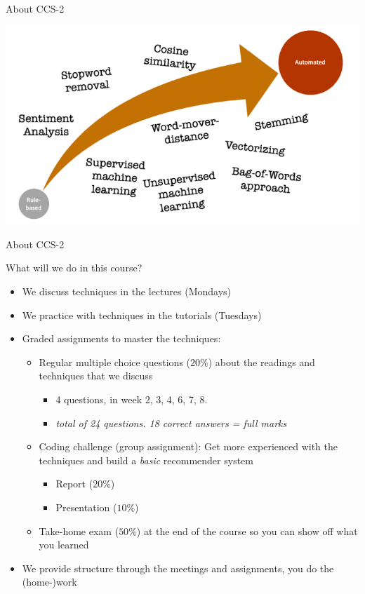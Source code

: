 \documentclass[handout]{beamer}
\begin{document}
\begin{frame}{About CCS-2}
	\begin{center}
		\includegraphics[width=\linewidth,height=\textheight,keepaspectratio]{../pictures/Roadmap_terms.png} 
	\end{center}
	
\end{frame}


\begin{frame}{About CCS-2} 

What will we do in this course?	
	\begin{itemize}[<+->]
		\item We discuss techniques in the lectures (Mondays)
		\item We practice with techniques in the tutorials (Tuesdays)
		\item Graded assignments to master the techniques:
		\begin{itemize}
			\item Regular multiple choice questions (\(20\%\)) about the readings and techniques that we discuss
			\begin{itemize}
				\item 4 questions, in week 2, 3, 4, 6, 7, 8. 
				\item \emph{total of 24 questions. 18 correct answers = full marks}
			\end{itemize}
			\item Coding challenge (group assignment): Get more experienced with the techniques and build a \emph{basic} recommender system
			\begin{itemize}
				\item Report (\(20\%\))
				\item Presentation (\(10\%\))
			\end{itemize}
			\item Take-home exam (\(50\%\)) at the end of the course so you can show off what you learned
		\end{itemize}
		\item We provide structure through the meetings and assignments, you do the (home-)work
	\end{itemize}
	
\end{frame}
\end{document}
